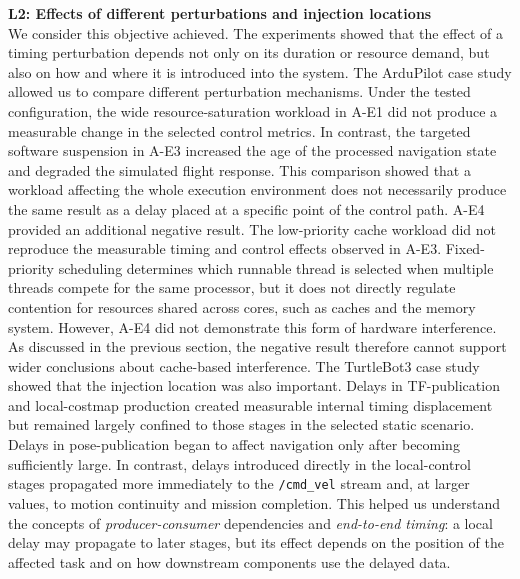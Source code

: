 \noindent\textbf{L2: Effects of different perturbations and injection locations} \\ %
We consider this objective achieved. The experiments showed that the effect of a timing perturbation depends not only on its duration or resource demand, but also on how and where it is introduced into the system.
The ArduPilot case study allowed us to compare different perturbation mechanisms. Under the tested configuration, the wide resource-saturation workload in A-E1 did not produce a measurable change in the selected control metrics. In contrast, the targeted software suspension in A-E3 increased the age of the processed navigation state and degraded the simulated flight response. This comparison showed that a workload affecting the whole execution environment does not necessarily produce the same result as a delay placed at a specific point of the control path.
A-E4 provided an additional negative result. The low-priority cache workload did not reproduce the measurable timing and control effects observed in A-E3. Fixed-priority scheduling determines which runnable thread is selected when multiple threads compete for the same processor, but it does not directly regulate contention for resources shared across cores, such as caches and the memory system. However, A-E4 did not demonstrate this form of hardware interference. As discussed in the previous section, the negative result therefore cannot support wider conclusions about cache-based interference.
The TurtleBot3 case study showed that the injection location was also important. Delays in TF-publication and local-costmap production created measurable internal timing displacement but remained largely confined to those stages in the selected static scenario. Delays in pose-publication began to affect navigation only after becoming sufficiently large. In contrast, delays introduced directly in the local-control stages propagated more immediately to the \texttt{/cmd\_vel} stream and, at larger values, to motion continuity and mission completion. This helped us understand the concepts of \textit{producer-consumer} dependencies and \textit{end-to-end timing}: a local delay may propagate to later stages, but its effect depends on the position of the affected task and on how downstream components use the delayed data.


